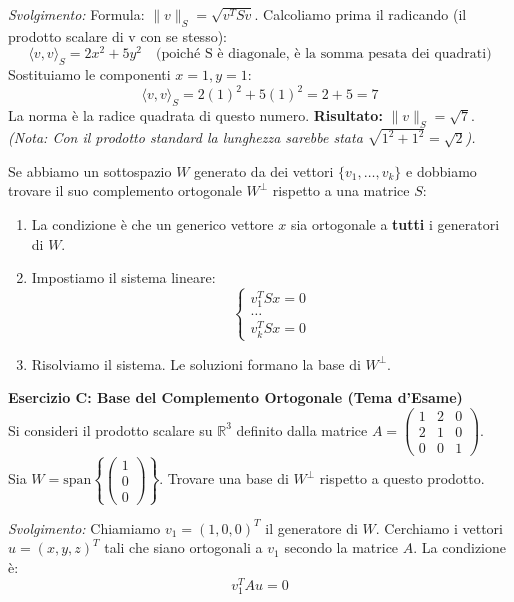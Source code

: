 \documentclass[10pt,a4paper]{article}
\begin{document}
\textit{Svolgimento:}
Formula: $\|v\|_S = \sqrt{v^T S v}$.
Calcoliamo prima il radicando (il prodotto scalare di v con se stesso):
\[ \langle v, v \rangle_S = 2x^2 + 5y^2 \quad \text{(poiché S è diagonale, è la somma pesata dei quadrati)} \]
Sostituiamo le componenti $x=1, y=1$:
\[ \langle v, v \rangle_S = 2(1)^2 + 5(1)^2 = 2 + 5 = 7 \]
La norma è la radice quadrata di questo numero.
\textbf{Risultato:} $\|v\|_S = \sqrt{7}$.
\textit{(Nota: Con il prodotto standard la lunghezza sarebbe stata $\sqrt{1^2+1^2}=\sqrt{2}$).}
\vspace{0.4cm}
\begin{tcolorbox}[colback=purple!5!white,colframe=purple!75!black,title=\textbf{Complemento Ortogonale $W^\perp$}]
Se abbiamo un sottospazio $W$ generato da dei vettori $\{v_1, \dots, v_k\}$ e dobbiamo trovare il suo complemento ortogonale $W^\perp$ rispetto a una matrice $S$:
\begin{enumerate}
    \item La condizione è che un generico vettore $x$ sia ortogonale a \textbf{tutti} i generatori di $W$.
    \item Impostiamo il sistema lineare:
    \[ \begin{cases} v_1^T S x = 0 \\ \dots \\ v_k^T S x = 0 \end{cases} \]
    \item Risolviamo il sistema. Le soluzioni formano la base di $W^\perp$.
\end{enumerate}
\end{tcolorbox}
\vspace{0.4cm}

\textbf{Esercizio C: Base del Complemento Ortogonale (Tema d'Esame)}
\\ Si consideri il prodotto scalare su $\mathbb{R}^3$ definito dalla matrice $A = \begin{pmatrix} 1 & 2 & 0 \\ 2 & 1 & 0 \\ 0 & 0 & 1 \end{pmatrix}$.
\\ Sia $W = \text{span}\left\{ \begin{pmatrix} 1 \\ 0 \\ 0 \end{pmatrix} \right\}$. Trovare una base di $W^\perp$ rispetto a questo prodotto.

\textit{Svolgimento:}
Chiamiamo $v_1 = (1, 0, 0)^T$ il generatore di $W$.
Cerchiamo i vettori $u = (x, y, z)^T$ tali che siano ortogonali a $v_1$ secondo la matrice $A$.
La condizione è:
\[ v_1^T A u = 0 \]
\end{document}
